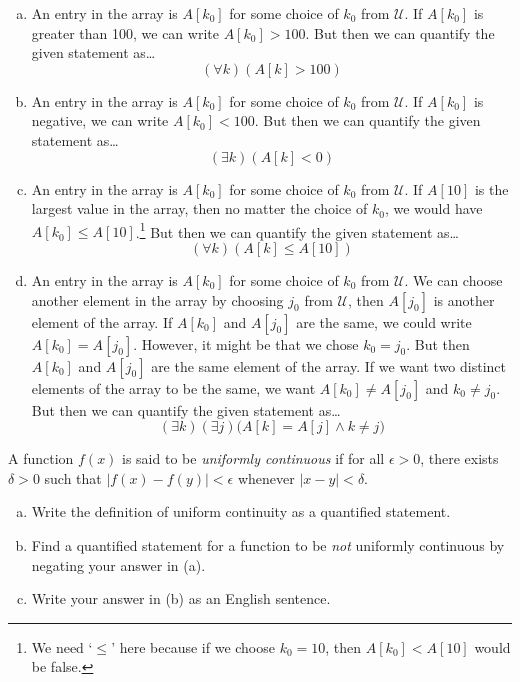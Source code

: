 \documentclass[11pt,letterpaper]{article}
\begin{document}
\begin{enumerate}[(a)]
\item An entry in the array is $A[k_0]$ for some choice of $k_0$ from $\mathcal{U}$. If $A[k_0]$ is greater than 100, we can write $A[k_0] > 100$. But then we can quantify the given statement as\dots
	\[
	(\forall k) (A[k] > 100)
	\] \pspace

\item An entry in the array is $A[k_0]$ for some choice of $k_0$ from $\mathcal{U}$. If $A[k_0]$ is negative, we can write $A[k_0] < 100$. But then we can quantify the given statement as\dots
	\[
	(\exists k) (A[k] < 0)
	\] \pspace
 
\item An entry in the array is $A[k_0]$ for some choice of $k_0$ from $\mathcal{U}$. If $A[10]$ is the largest value in the array, then no matter the choice of $k_0$, we would have $A[k_0] \leq A[10]$.\footnote{We need `$\leq$' here because if we choose $k_0= 10$, then $A[k_0] < A[10]$ would be false.} But then we can quantify the given statement as\dots
	\[
	(\forall k) ( A[k] \leq A[10] )
	\] \pspace
 
\item An entry in the array is $A[k_0]$ for some choice of $k_0$ from $\mathcal{U}$. We can choose another element in the array by choosing $j_0$ from $\mathcal{U}$, then $A[j_0]$ is another element of the array. If $A[k_0]$ and $A[j_0]$ are the same, we could write $A[k_0]= A[j_0]$. However, it might be that we chose $k_0= j_0$. But then $A[k_0]$ and $A[j_0]$ are the same element of the array. If we want two distinct elements of the array to be the same, we want $A[k_0] \neq A[j_0]$ and $k_0 \neq j_0$. But then we can quantify the given statement as\dots
	\[
	(\exists k)(\exists j) \big( A[k]= A[j] \wedge k \neq j \big)
	\]  
\end{enumerate}



\newpage



 A function $f(x)$ is said to be \textit{uniformly continuous} if for all $\epsilon > 0$, there exists $\delta > 0$ such that $|f(x) - f(y)| < \epsilon$ whenever $|x - y| < \delta$. 
	\begin{enumerate}[(a)]
	\item Write the definition of uniform continuity as a quantified statement. 
	\item Find a quantified statement for a function to be \textit{not} uniformly continuous by negating your answer in (a). 
	\item Write your answer in (b) as an English sentence. 
	\end{enumerate} \pspace
\end{document}
